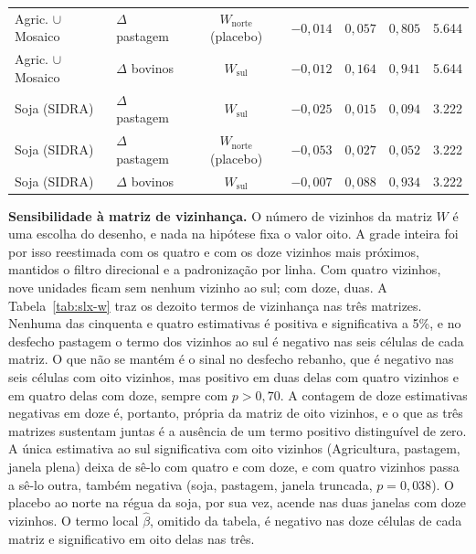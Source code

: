 \begin{table}[!ht]
\begin{tabular}{llccccr}
Agric. $\cup$ Mosaico & $\Delta$ pastagem & $W_{\mathrm{norte}}$ (placebo) & $-0{,}014$ & $0{,}057$ & $0{,}805$ & 5.644 \\
Agric. $\cup$ Mosaico & $\Delta$ bovinos & $W_{\mathrm{sul}}$ & $-0{,}012$ & $0{,}164$ & $0{,}941$ & 5.644 \\
Soja (SIDRA) & $\Delta$ pastagem & $W_{\mathrm{sul}}$ & $-0{,}025$ & $0{,}015$ & $0{,}094$ & 3.222 \\
Soja (SIDRA) & $\Delta$ pastagem & $W_{\mathrm{norte}}$ (placebo) & $-0{,}053$ & $0{,}027$ & $0{,}052$ & 3.222 \\
Soja (SIDRA) & $\Delta$ bovinos & $W_{\mathrm{sul}}$ & $-0{,}007$ & $0{,}088$ & $0{,}934$ & 3.222 \\
\bottomrule
\end{tabular}
\end{table}


\textbf{Sensibilidade à matriz de vizinhança.} O número de vizinhos da matriz
\(W\) é uma escolha do desenho, e nada na hipótese fixa o valor oito. A grade
inteira foi por isso reestimada com os quatro e com os doze vizinhos mais
próximos, mantidos o filtro direcional e a padronização por linha. Com quatro
vizinhos, nove unidades ficam sem nenhum vizinho ao sul; com doze, duas. A
Tabela~\ref{tab:slx-w} traz os dezoito termos de vizinhança nas três matrizes.
Nenhuma das cinquenta e quatro estimativas é positiva e significativa a 5\%, e
no desfecho pastagem o termo dos vizinhos ao sul é negativo nas seis células de
cada matriz. O que não se mantém é o sinal no desfecho rebanho, que é negativo
nas seis células com oito vizinhos, mas positivo em duas delas com quatro
vizinhos e em quatro delas com doze, sempre com \(p > 0{,}70\). A contagem de
doze estimativas negativas em doze é, portanto, própria da matriz de oito
vizinhos, e o que as três matrizes sustentam juntas é a ausência de um termo
positivo distinguível de zero. A única estimativa ao sul significativa com oito
vizinhos (Agricultura, pastagem, janela plena) deixa de sê-lo com quatro e com
doze, e com quatro vizinhos passa a sê-lo outra, também negativa (soja,
pastagem, janela truncada, \(p = 0{,}038\)). O placebo ao norte na régua da soja, por sua vez, acende nas duas janelas
com doze vizinhos. O termo local \(\hat{\beta}\), omitido da tabela, é
negativo nas doze células de cada matriz e significativo em oito delas nas três.



